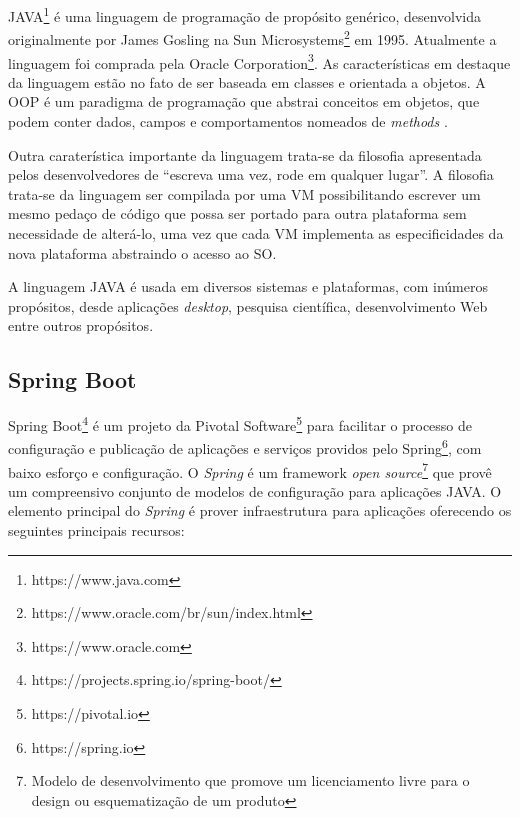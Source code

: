 JAVA\footnote{https://www.java.com} é uma linguagem de programação de propósito genérico, desenvolvida originalmente por James Gosling na Sun Microsystems\footnote{ https://www.oracle.com/br/sun/index.html} em 1995. Atualmente a linguagem foi comprada pela Oracle Corporation\footnote{https://www.oracle.com}. As características em destaque da linguagem estão no fato de ser baseada em classes e orientada a objetos. A \ac{OOP} é um paradigma de programação que abstrai conceitos em objetos, que podem conter dados, campos e comportamentos nomeados de \textit{methods} \citep{Lewis2000}. 

Outra caraterística importante da linguagem trata-se da filosofia apresentada pelos desenvolvedores de “escreva uma vez, rode em qualquer lugar”. A filosofia trata-se da linguagem ser compilada por uma \ac{VM} possibilitando escrever um mesmo pedaço de código que possa ser portado para outra plataforma sem necessidade de alterá-lo, uma vez que cada \ac{VM} implementa as especificidades da nova plataforma abstraindo o acesso ao \ac{SO}.

A linguagem JAVA é usada em diversos sistemas e plataformas, com inúmeros propósitos, desde aplicações \textit{desktop}, pesquisa científica, desenvolvimento Web entre outros propósitos.

\subsection{Spring Boot}

Spring Boot\footnote{https://projects.spring.io/spring-boot/} é um projeto da Pivotal Software\footnote{https://pivotal.io} para facilitar o processo de configuração e publicação de aplicações e serviços providos pelo Spring\footnote{https://spring.io}, com baixo esforço e configuração. O \textit{Spring} é um framework \textit{open source}\footnote{Modelo de desenvolvimento que promove um licenciamento livre para o design ou esquematização de um produto} que provê um compreensivo conjunto de modelos de configuração para aplicações JAVA. O elemento principal do \textit{Spring} é prover infraestrutura para aplicações oferecendo os seguintes principais recursos:

